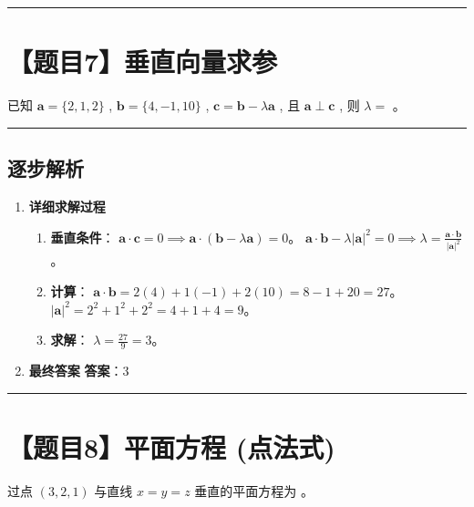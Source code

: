 \documentclass[UTF8]{ctexart}
\newenvironment{redenv}{\color{red}}{}
\newenvironment{detailedanalysis}{%
    \color{red}
    \begin{enumerate}[label=\textbf{第\arabic*步：}, leftmargin=*, align=left, itemsep=1.5ex]
}{%
    \end{enumerate}
}
\newcommand{\problemrule}{\noindent\rule{\textwidth}{1.5pt}\vspace{-0.8em}}
\newcommand{\analysisrule}{\noindent\rule{\textwidth}{0.8pt}\vspace{-0.8em}}
\newcommand{\blank}[1]{\underline{\hspace{#1}}}
\begin{document}
\problemrule
\section*{【题目7】垂直向量求参}
已知 $ \mathbf{a} = \{2, 1, 2\} $ , $ \mathbf{b} = \{4, -1, 10\} $ , $ \mathbf{c} = \mathbf{b} - \lambda \mathbf{a} $ , 且 $ \mathbf{a} \perp \mathbf{c} $ , 则 $ \lambda = $ \blank{2cm}。

\begin{redenv}
\analysisrule
\subsection*{逐步解析}

\begin{detailedanalysis}
\item \textbf{详细求解过程}
\begin{enumerate}[label=(\arabic*)]
\item \textbf{垂直条件}：
$\mathbf{a} \cdot \mathbf{c} = 0 \implies \mathbf{a} \cdot (\mathbf{b} - \lambda \mathbf{a}) = 0$。
$\mathbf{a} \cdot \mathbf{b} - \lambda |\mathbf{a}|^2 = 0 \implies \lambda = \frac{\mathbf{a} \cdot \mathbf{b}}{|\mathbf{a}|^2}$。
\item \textbf{计算}：
$\mathbf{a} \cdot \mathbf{b} = 2(4) + 1(-1) + 2(10) = 8 - 1 + 20 = 27$。
$|\mathbf{a}|^2 = 2^2 + 1^2 + 2^2 = 4 + 1 + 4 = 9$。
\item \textbf{求解}：
$\lambda = \frac{27}{9} = 3$。
\end{enumerate}

\item \textbf{最终答案}
\textbf{答案}：3
\end{detailedanalysis}
\end{redenv}

\problemrule
\section*{【题目8】平面方程 (点法式)}
过点 $ (3,2,1) $ 与直线 $ x = y = z $ 垂直的平面方程为 \blank{2cm}。
\end{document}
